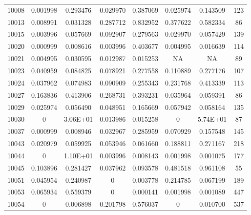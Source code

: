 \begin{table}[H]
{\begin{tabular}{cccccccc}
10008 & {\color{red}0.001998} & 0.293476 & {\color{red}0.029970} & 0.387069 & {\color{red}0.025974} & 0.143509 & 123 \\ 
10013 & {\color{red}0.008991} & {\color{red}0.031328} & 0.287712 & 0.832952 & 0.377622 & 0.582334 & 86 \\ 
10015 & {\color{red}0.003996} & 0.057669 & 0.092907 & 0.279563 & {\color{red}0.029970} & 0.057429 & 139 \\ 
10020 & {\color{red}0.000999} & {\color{red}0.008616} & {\color{red}0.003996} & 0.403677 & {\color{red}0.004995} & {\color{red}0.016639} & 114 \\ 
10021 & {\color{red}0.004995} & {\color{red}0.030595} & {\color{red}0.012987} & {\color{red}0.015253} & NA & NA & 89 \\ 
10023 & {\color{red}0.040959} & 0.084825 & 0.078921 & 0.277558 & 0.110889 & 0.277176 & 107 \\ 
10024 & {\color{red}0.037962} & 0.074983 & 0.090909 & 0.255343 & 0.231768 & 0.413339 & 113 \\ 
10027 & 0.163836 & 0.413906 & 0.268731 & 0.393231 & {\color{red}0.035964} & 0.059391 & 86 \\ 
10029 & {\color{red}0.025974} & 0.056490 & {\color{red}0.048951} & 0.165669 & 0.057942 & 0.058164 & 135 \\ 
10030 & {\color{red}0} & 3.06E+01 & {\color{red}0.013986} & {\color{red}0.015258} & {\color{red}0} & 5.74E+01 & 87 \\ 
10037 & {\color{red}0.000999} & {\color{red}0.008946} & {\color{red}0.032967} & 0.285959 & 0.070929 & 0.157548 & 145 \\ 
10043 & {\color{red}0.020979} & 0.059925 & 0.053946 & 0.061660 & 0.188811 & 0.271167 & 218 \\ 
10044 & {\color{red}0} & 1.10E+01 & {\color{red}0.003996} & {\color{red}0.008143} & {\color{red}0.001998} & {\color{red}0.001075} & 177 \\ 
10045 & 0.103896 & 0.281427 & {\color{red}0.037962} & 0.093578 & 0.481518 & 0.961108 & 55 \\ 
10051 & {\color{red}0.045954} & 0.240987 & {\color{red}0} & {\color{red}0.003778} & 0.214785 & 0.067199 & 189 \\ 
10053 & 0.065934 & 0.559379 & {\color{red}0} & {\color{red}0.000141} & {\color{red}0.001998} & {\color{red}0.001089} & 447 \\ 
10054 & {\color{red}0} & {\color{red}0.006898} & 0.201798 & 0.576037 & {\color{red}0} & {\color{red}0.010700} & 537 \\ 

\end{tabular}}
\end{table}

